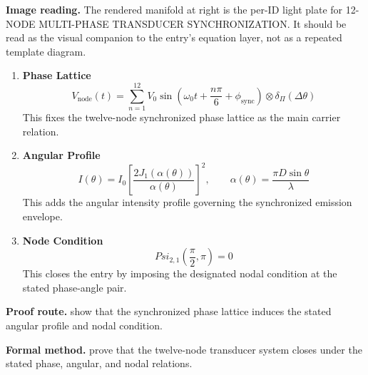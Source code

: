 \begin{samepage}
\noindent\begin{minipage}[t]{0.45\linewidth}
\vspace{0pt}
\raggedright
\scriptsize\textbf{Image reading.} The rendered manifold at right is the per-ID light plate for 12-NODE MULTI-PHASE TRANSDUCER SYNCHRONIZATION. It should be read as the visual companion to the entry's equation layer, not as a repeated template diagram.\par
\end{minipage}\hfill
\begin{minipage}[t]{0.53\linewidth}
\vspace*{-0.10in}
\raggedright
{}
\end{minipage}
\end{samepage}

\clearpage


\begin{enumerate}[leftmargin=1.6em,itemsep=9pt,topsep=6pt]
\item \textbf{Phase Lattice}
\[
V_{\mathrm{node}}(t)=\sum_{n=1}^{12}V_{0}\sin\!\left(\omega_{0}t+\frac{n\pi}{6}+\phi_{\mathrm{sync}}\right)\otimes \delta_{\Pi}(\Delta\theta)
\]
This fixes the twelve-node synchronized phase lattice as the main carrier relation.

\item \textbf{Angular Profile}
\[
I(\theta)=I_{0}\left[\frac{2J_{1}(\alpha(\theta))}{\alpha(\theta)}\right]^{2},\qquad \alpha(\theta)=\frac{\pi D\sin\theta}{\lambda}
\]
This adds the angular intensity profile governing the synchronized emission envelope.

\item \textbf{Node Condition}
\[
Psi_{2,1}\!\left(\frac{\pi}{2},\pi\right)=0
\]
This closes the entry by imposing the designated nodal condition at the stated phase-angle pair.
\end{enumerate}

\textbf{Proof route.} show that the synchronized phase lattice induces the stated angular profile and nodal condition.

\textbf{Formal method.} prove that the twelve-node transducer system closes under the stated phase, angular, and nodal relations.

\medskip
{}

